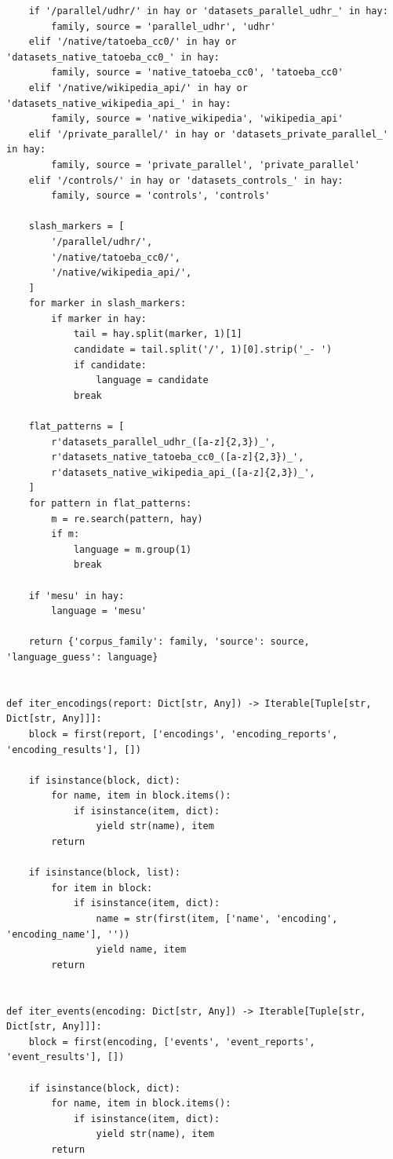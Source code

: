 \documentclass[11pt,a4paper]{article}
\begin{document}
\begin{lstlisting}
    if '/parallel/udhr/' in hay or 'datasets_parallel_udhr_' in hay:
        family, source = 'parallel_udhr', 'udhr'
    elif '/native/tatoeba_cc0/' in hay or 'datasets_native_tatoeba_cc0_' in hay:
        family, source = 'native_tatoeba_cc0', 'tatoeba_cc0'
    elif '/native/wikipedia_api/' in hay or 'datasets_native_wikipedia_api_' in hay:
        family, source = 'native_wikipedia', 'wikipedia_api'
    elif '/private_parallel/' in hay or 'datasets_private_parallel_' in hay:
        family, source = 'private_parallel', 'private_parallel'
    elif '/controls/' in hay or 'datasets_controls_' in hay:
        family, source = 'controls', 'controls'

    slash_markers = [
        '/parallel/udhr/',
        '/native/tatoeba_cc0/',
        '/native/wikipedia_api/',
    ]
    for marker in slash_markers:
        if marker in hay:
            tail = hay.split(marker, 1)[1]
            candidate = tail.split('/', 1)[0].strip('_- ')
            if candidate:
                language = candidate
            break

    flat_patterns = [
        r'datasets_parallel_udhr_([a-z]{2,3})_',
        r'datasets_native_tatoeba_cc0_([a-z]{2,3})_',
        r'datasets_native_wikipedia_api_([a-z]{2,3})_',
    ]
    for pattern in flat_patterns:
        m = re.search(pattern, hay)
        if m:
            language = m.group(1)
            break

    if 'mesu' in hay:
        language = 'mesu'

    return {'corpus_family': family, 'source': source, 'language_guess': language}


def iter_encodings(report: Dict[str, Any]) -> Iterable[Tuple[str, Dict[str, Any]]]:
    block = first(report, ['encodings', 'encoding_reports', 'encoding_results'], [])

    if isinstance(block, dict):
        for name, item in block.items():
            if isinstance(item, dict):
                yield str(name), item
        return

    if isinstance(block, list):
        for item in block:
            if isinstance(item, dict):
                name = str(first(item, ['name', 'encoding', 'encoding_name'], ''))
                yield name, item
        return


def iter_events(encoding: Dict[str, Any]) -> Iterable[Tuple[str, Dict[str, Any]]]:
    block = first(encoding, ['events', 'event_reports', 'event_results'], [])

    if isinstance(block, dict):
        for name, item in block.items():
            if isinstance(item, dict):
                yield str(name), item
        return


\end{lstlisting}
\end{document}
